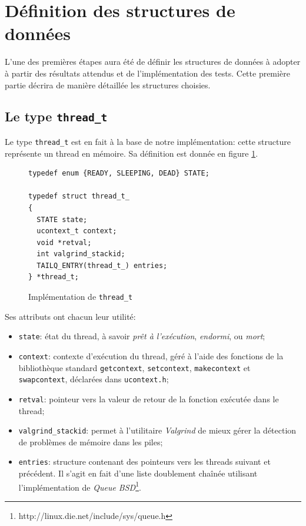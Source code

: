 \documentclass[a4paper,11pt]{article}
\begin{document}
\section{Définition des structures de données}

L'une des premières étapes aura été de définir les structures de données à adopter à partir des résultats attendus et de l'implémentation des tests. Cette première partie décrira de manière détaillée les structures choisies.

\subsection{Le type \texttt{thread\_t}}

Le type \texttt{thread\_t} est en fait à la base de notre implémentation: cette structure représente un thread en mémoire. Sa définition est donnée en figure \ref{threadt}.

\begin{figure}[H]
\begin{lstlisting}
typedef enum {READY, SLEEPING, DEAD} STATE;

typedef struct thread_t_
{
  STATE state;
  ucontext_t context;
  void *retval;
  int valgrind_stackid;
  TAILQ_ENTRY(thread_t_) entries;
} *thread_t;
\end{lstlisting}
\caption{Implémentation de \texttt{thread\_t}}
\label{threadt}
\end{figure}

Ses attributs ont chacun leur utilité:
\begin{itemize}
  \item \texttt{state}: état du thread, à savoir \emph{prêt à l'exécution}, \emph{endormi}, ou \emph{mort};
  \item \texttt{context}: contexte d'exécution du thread, géré à l'aide des fonctions de la bibliothèque standard \texttt{getcontext}, \texttt{setcontext}, \texttt{makecontext} et \texttt{swapcontext}, déclarées dans \texttt{ucontext.h};
  \item \texttt{retval}: pointeur vers la valeur de retour de la fonction exécutée dans le thread;
  \item \texttt{valgrind\_stackid}: permet à l'utilitaire \textit{Valgrind} de mieux gérer la détection de problèmes de mémoire dans les piles;
  \item \texttt{entries}: structure contenant des pointeurs vers les threads suivant et précédent. Il s'agit en fait d'une liste doublement chaînée utilisant l'implémentation de \textit{Queue BSD}\footnote{http://linux.die.net/include/sys/queue.h}.
\end{itemize}
\end{document}
